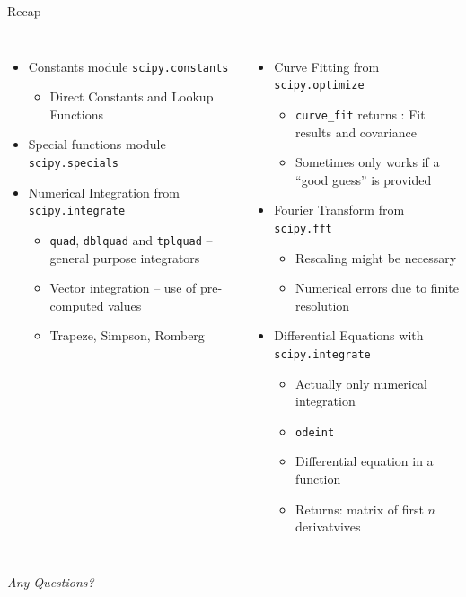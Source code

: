 
\begin{frame}[t,plain]
\titlepage
\end{frame}


\begin{frame}{Recap}
%
\begin{columns}[T]
\begin{itemize}
\item Constants module \texttt{scipy.constants}
	\begin{itemize}
	\item Direct Constants and Lookup Functions
	\end{itemize}
\item Special functions module  \texttt{scipy.specials}
\item Numerical Integration from \texttt{scipy.integrate}
	\begin{itemize}
	\item \texttt{quad}, \texttt{dblquad} and \texttt{tplquad} -- general purpose integrators
	\item Vector integration -- use of pre-computed values
	\item Trapeze, Simpson, Romberg
	\end{itemize}
\end{itemize}
%
\begin{itemize}
\item Curve Fitting from \texttt{scipy.optimize}
	\begin{itemize}
	\item \texttt{curve\_fit} returns : Fit results and covariance
	\item Sometimes only works if a \enquote{good guess} is provided
	\end{itemize}
\item Fourier Transform from \texttt{scipy.fft}
	\begin{itemize}
	\item Rescaling might be necessary
	\item Numerical errors due to finite resolution
	\end{itemize}
\item Differential Equations with \texttt{scipy.integrate}
	\begin{itemize}
	\item Actually only numerical integration
	\item \texttt{odeint}
	\item Differential equation in a function
	\item Returns: matrix of first $n$ derivatvives
	\end{itemize}
\end{itemize}

\end{columns}
%
\begin{center}
	\emph{Any Questions?}
\end{center}
%
\end{frame}

